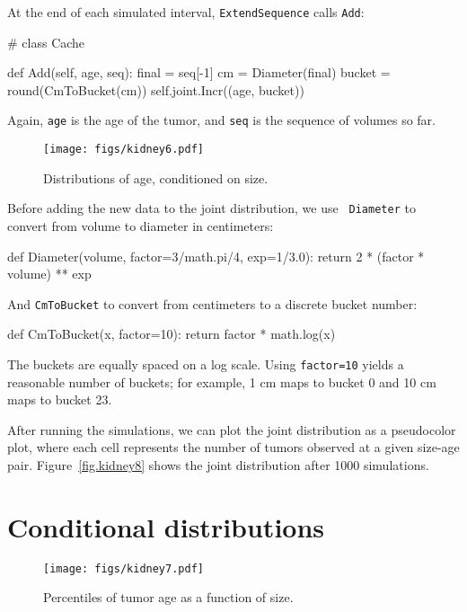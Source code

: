 \documentclass[12pt]{book}
\theoremstyle{exercise}
\newcommand{\py}[1]{{\tt #1}}%
\begin{document}
At the end of each simulated interval, \py{ExtendSequence} calls
\py{Add}:

\begin{code}
# class Cache

    def Add(self, age, seq):
        final = seq[-1]
        cm = Diameter(final)
        bucket = round(CmToBucket(cm))
        self.joint.Incr((age, bucket))
\end{code}

Again, \py{age} is the age of the tumor, and \py{seq} is the
sequence of volumes so far.

\begin{figure}
\centerline{\texttt{[image: figs/kidney6.pdf]}}
\caption{Distributions of age, conditioned on size.}
\label{fig.kidney6}
\end{figure}

Before adding the new data to the joint distribution, we use {\tt
  Diameter} to convert from volume to diameter in centimeters:

\begin{code}
def Diameter(volume, factor=3/math.pi/4, exp=1/3.0):
    return 2 * (factor * volume) ** exp
\end{code}

And
\py{CmToBucket} to convert from centimeters to a discrete bucket
number:

\begin{code}
def CmToBucket(x, factor=10):
    return factor * math.log(x)
\end{code}

The buckets are equally spaced on a log scale.  Using \py{factor=10}
yields a reasonable number of buckets; for example,
1 cm maps to bucket 0 and 10 cm maps to bucket 23.

After running the simulations, we can plot the joint distribution
as a pseudocolor plot, where each cell represents the number of
tumors observed at a given size-age pair.
Figure~\ref{fig.kidney8} shows the joint distribution after 1000
simulations.



\section{Conditional distributions}

\begin{figure}
\centerline{\texttt{[image: figs/kidney7.pdf]}}
\caption{Percentiles of tumor age as a function of size.}
\label{fig.kidney7}
\end{figure}
\end{document}
